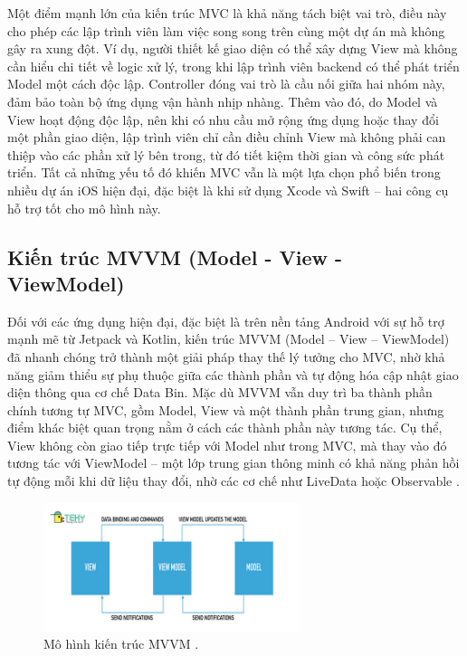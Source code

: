     \begin{flushleft}
      \hspace*{0.8cm}Một điểm mạnh lớn của kiến trúc MVC là khả năng tách biệt vai trò, điều này cho phép các lập trình viên làm việc song song trên cùng một dự án mà không gây ra xung đột. Ví dụ, người thiết kế giao diện có thể xây dựng View mà không cần hiểu chi tiết về logic xử lý, trong khi lập trình viên backend có thể phát triển Model một cách độc lập. Controller đóng vai trò là cầu nối giữa hai nhóm này, đảm bảo toàn bộ ứng dụng vận hành nhịp nhàng. Thêm vào đó, do Model và View hoạt động độc lập, nên khi có nhu cầu mở rộng ứng dụng hoặc thay đổi một phần giao diện, lập trình viên chỉ cần điều chỉnh View mà không phải can thiệp vào các phần xử lý bên trong, từ đó tiết kiệm thời gian và công sức phát triển. Tất cả những yếu tố đó khiến MVC vẫn là một lựa chọn phổ biến trong nhiều dự án iOS hiện đại, đặc biệt là khi sử dụng Xcode và Swift – hai công cụ hỗ trợ tốt cho mô hình này.
    \end{flushleft}

\subsection{Kiến trúc MVVM (Model - View - ViewModel)}
\renewcommand{\labelitemi}{--}    
    \begin{flushleft}
        \hspace*{0.8cm}Đối với các ứng dụng hiện đại, đặc biệt là trên nền tảng Android với sự hỗ trợ mạnh mẽ từ Jetpack và Kotlin, kiến trúc MVVM (Model – View – ViewModel) đã nhanh chóng trở thành một giải pháp thay thế lý tưởng cho MVC, nhờ khả năng giảm thiểu sự phụ thuộc giữa các thành phần và tự động hóa cập nhật giao diện thông qua cơ chế Data Bin. Mặc dù MVVM vẫn duy trì ba thành phần chính tương tự MVC, gồm Model, View và một thành phần trung gian, nhưng điểm khác biệt quan trọng nằm ở cách các thành phần này tương tác. Cụ thể, View không còn giao tiếp trực tiếp với Model như trong MVC, mà thay vào đó tương tác với ViewModel – một lớp trung gian thông minh có khả năng phản hồi tự động mỗi khi dữ liệu thay đổi, nhờ các cơ chế như LiveData hoặc Observable \cite{livedata-observable}.
    \end{flushleft}

\begin{figure}[H]
  \centering
  \includegraphics[width=0.67\textwidth]{images/mvvm.jpg}
  \caption{Mô hình kiến trúc MVVM \cite{tekyMVVM}.}
  \label{fig:fig18}
\end{figure}

